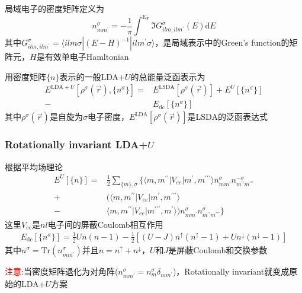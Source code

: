 {{局域电子的密度矩阵定义为
\begin{displaymath}
	n_{mm^{\prime}}^{\sigma}=-\frac1{\pi}\int^{\mathrm{E_F}}\Im G_{ilm,ilm^{\prime}}^{\sigma}(E)\mathrm{d}E
\end{displaymath}
其中$G_{ilm,ilm^{\prime}}^{\sigma}=\langle ilm\sigma|(E-H)^{-1}|ilm^{\prime}\sigma\rangle$，是局域表示中的\textrm{Green's function}的矩阵元，$H$是有效单电子\textrm{Hamltonian}

用密度矩阵$\{n\}$表示的一般\textrm{LDA+}$U$的总能量泛函表示为
\begin{displaymath}
	\begin{aligned}
		E^{\mathrm{LDA}+U}[\rho^{\sigma}(\vec r),\{n^{\sigma}\}]=&E^{\mathrm{LSDA}}[\rho^{\sigma}(\vec r)]+E^U[\{n^{\sigma}\}]\\
		-&E_{\mathrm{dc}}[\{n^{\sigma}\}]
	\end{aligned}
\end{displaymath}
其中$\rho^{\sigma}(\vec r)$是自旋为$\sigma$电子密度，$E^{\mathrm{LDA}}[\rho^{\sigma}(\vec r)]$是\textrm{LSDA}的泛函表达式
}

\frame
{
	\frametitle{\textrm{Rotationally invariant LDA+}$U$}
	根据平均场理论
	\begin{displaymath}
		\begin{aligned}
			E^U[\{n\}]=&\frac12\sum_{\{m\},\sigma}\{\langle m,m^{\prime\prime}|V_{ee}|m^{\prime},m^{\prime\prime\prime}\rangle n_{mm^{\prime}}^{\sigma}n_{m^{\prime\prime}m^{\prime\prime\prime}}^{-\sigma}\\
			+&(\langle m,m^{\prime\prime}|V_{ee}|m^{\prime},m^{\prime\prime\prime}\rangle\\
			-&\langle m,m^{\prime\prime}|V_{ee}|m^{\prime\prime\prime},m^{\prime}\rangle)n_{mm^{\prime}}^{\sigma}n_{m^{\prime\prime}m^{\prime\prime\prime}}^{\sigma}\}
		\end{aligned}
	\end{displaymath}
	这里$V_{ee}$是$nl$电子间的屏蔽\textrm{Coulomb}相互作用
\begin{displaymath}
	\begin{aligned}
		E_{\mathrm{dc}}[\{n^{\sigma}\}]=\frac12Un(n-1)-\frac12[(U-J)n^{\uparrow}(n^{\uparrow}-1)+Un^{\downarrow}(n^{\downarrow}-1)]
	\end{aligned}
\end{displaymath}
其中$n^{\sigma}=\mathrm{Tr}(n_{mm^{\prime}}^{\sigma})$并且$n=n^{\uparrow}+n^{\downarrow}$，$U$和$J$是屏蔽\textrm{Coulomb}和交换参数

\textcolor{red}{注意}:当密度矩阵退化为对角阵($n_{mm^{\prime}}^{\sigma}=n_m^{\sigma}\delta_{mm^{\prime}}$)，\textrm{Rotationally invariant}就变成原始的\textrm{LDA}+$U$方案
}

}
